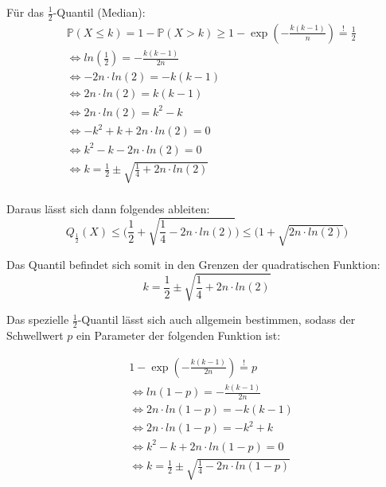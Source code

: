 \documentclass[../main.tex]{subfiles}
\begin{document}
\begin{flushleft}
        Für das  $\frac{1}{2}$-Quantil (Median):
        \begin{align*}
            & \mathbb{P}(X \leq k) = 1 - \mathbb{P}(X > k) \geq 1 - \exp(-\frac{ k(k-1) }{ n }) \overset{!}{=} \frac{ 1 }{ 2 } \\
            & \Leftrightarrow ln(\frac{ 1 }{ 2 }) = -\frac{ k(k-1)}{ 2n } \\
            & \Leftrightarrow -2n\cdot ln(2) = -k(k-1) \\
            & \Leftrightarrow 2n\cdot ln(2) = k(k-1) \\
            & \Leftrightarrow 2n\cdot ln(2) = k^{2} - k \\
            & \Leftrightarrow - k^{2} + k + 2n\cdot ln(2) = 0 \\
            & \Leftrightarrow k^{2} - k - 2n\cdot ln(2) = 0 \\
            & \Leftrightarrow k = \frac{ 1 }{ 2 } \pm \sqrt{ \frac{ 1 }{ 4 } + 2n\cdot ln(2)} \\
        \end{align*}

        Daraus lässt sich dann folgendes ableiten:
        \begin{equation}
            Q_{ \frac{ 1 }{ 2 } }(X) \leq \bigg( \frac{ 1 }{ 2 } + \sqrt{ \frac{ 1 }{ 4 } - 2n\cdot ln(2)} \bigg) \leq \bigg(1+\sqrt{ 2n\cdot ln(2) }\bigg)
        \end{equation}
        \newline

        Das Quantil befindet sich somit in den Grenzen der quadratischen Funktion:
        \begin{equation}
            k = \frac{ 1 }{ 2 } \pm \sqrt{ \frac{ 1 }{ 4 } + 2n\cdot ln(2)}
        \end{equation}

        Das spezielle $ \frac{1}{2} $-Quantil lässt sich auch allgemein bestimmen, sodass der Schwellwert $p$ ein Parameter der folgenden Funktion ist:

        \begin{align*}
            & 1 - \exp(-\frac{ k(k-1) }{ 2n }) \overset{!}{=} p \\
            & \Leftrightarrow ln(1-p) = -\frac{ k(k-1)}{ 2n } \\
            & \Leftrightarrow 2n\cdot ln(1-p) = -k(k-1) \\
            & \Leftrightarrow 2n\cdot ln(1-p) = -k^{ 2 } + k \\
            & \Leftrightarrow k^{ 2 } - k + 2n\cdot ln(1-p) = 0 \\
            & \Leftrightarrow k = \frac{ 1 }{ 2 } \pm \sqrt{ \frac{ 1 }{ 4 } - 2n\cdot ln(1-p)}
        \end{align*}


\end{flushleft}
\end{document}
